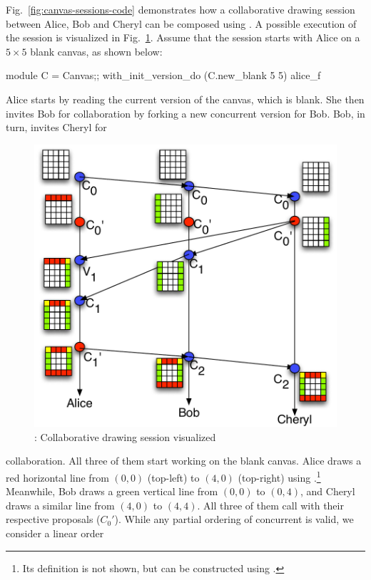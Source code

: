 Fig.~\ref{fig:canvas-sessions-code} demonstrates how a collaborative
drawing session between Alice, Bob and Cheryl can be composed using
\name. A possible execution of the session is visualized in
Fig.~\ref{fig:canvas-sessions}. Assume that the session starts with
Alice on a $5\times 5$ blank canvas, as shown below:
\begin{ocaml}
  module C = Canvas;;
  with_init_version_do (C.new_blank 5 5) alice_f
\end{ocaml}
Alice starts by reading the current version of the canvas, which is
blank. She then invites Bob for collaboration by forking a new
concurrent version for Bob. Bob, in turn, invites Cheryl for
\begin{figure}
\centering
\includegraphics[scale=0.6]{Figures/canvas-sessions}
\caption{\drawsome: Collaborative drawing session visualized}
\label{fig:canvas-sessions}
\end{figure}
collaboration. All three of them start working on the blank canvas.
Alice draws a red horizontal line from $(0,0)$ (top-left) to $(4,0)$
(top-right) using .\footnote{Its definition is not
  shown, but can be constructed using .} Meanwhile, Bob
draws a green vertical line from $(0,0)$ to $(0,4)$, and Cheryl draws
a similar line from $(4,0)$ to $(4,4)$. All three of them call
 with their respective proposals ($C_0'$). While any partial
ordering of concurrent  is valid, we consider a linear order
